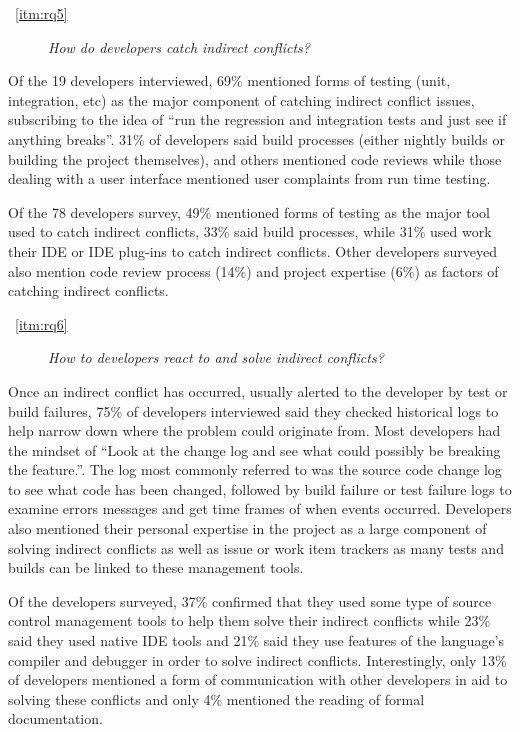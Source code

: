 \documentclass[conference]{IEEEtran}
\begin{document}

\begin{description}
	\item[~\ref{itm:rq5}] \textit{How do developers catch indirect conflicts?}
\end{description}

Of the 19 developers interviewed, 69\% mentioned forms of testing (unit, integration, etc) as the major component of catching indirect
conflict issues, subscribing to the idea of ``run the regression and integration tests and just see if anything breaks''. 31\% of developers 
said build processes (either nightly builds or building the project themselves), and others mentioned code reviews
while those dealing with a user interface mentioned user complaints from run time testing.

Of the 78 developers survey, 49\% mentioned forms of testing as the major tool used to catch indirect conflicts, 33\% said build processes,
while 31\% used work their IDE or IDE plug-ins to catch indirect conflicts. Other developers surveyed also mention code review process (14\%)
and project expertise (6\%) as factors of catching indirect conflicts.

\begin{description}
	\item[~\ref{itm:rq6}] \textit{How to developers react to and solve indirect conflicts?}
\end{description}

Once an indirect conflict has occurred, usually alerted to the developer by test or build failures, 75\% of developers interviewed said
they checked historical logs to help narrow down where the problem could originate from. Most developers had the mindset of
``Look at the change log and see what could possibly be breaking the feature.''. The log most commonly referred to was the source
code change log to see what code has been changed, followed by build failure or test failure logs to examine errors messages and get time 
frames of when events occurred. Developers also mentioned their personal expertise in the project as a large component of solving indirect
conflicts as well as issue or work item trackers as many tests and builds can be linked to these management tools.

Of the developers surveyed, 37\% confirmed that they used some type of source control management tools to help them solve their indirect
conflicts while 23\% said they used native IDE tools and 21\% said they use features of the language's compiler and debugger in order
to solve indirect conflicts. Interestingly, only 13\% of developers mentioned a form of communication with other developers in aid to
solving these conflicts and only 4\% mentioned the reading of formal documentation.
\end{document}
